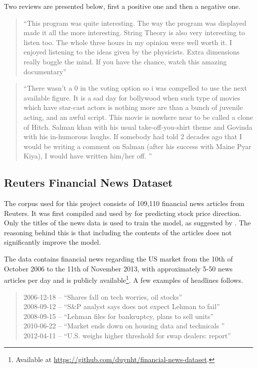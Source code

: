 Two reviews are presented below, first a positive one and then a negative one. 

\begin{quote}
    ``This program was quite interesting. The way the program was displayed made it all the more interesting. String Theory is also very interesting to listen too. The whole three hours in my opinion were well worth it. I enjoyed listening to the ideas given by the physicists. Extra dimensions really boggle the mind. If you have the chance, watch this amazing documentary'' 
\end{quote}
\begin{quote}
    ``There wasn't a 0 in the voting option so i was compelled to use the next available figure. It is a sad day for bollywood when such type of movies which have star-cast actors is nothing more are than a bunch of juvenile acting, and an awful script. This movie is nowhere near to be called a clone of Hitch. Salman khan with his usual take-off-you-shirt theme and Govinda with his in-humorous laughs. If somebody had told 2 decades ago that I would be writing a comment on Salman (after his success with Maine Pyar Kiya), I would have written him/her off. ''
\end{quote}

\subsection{Reuters Financial News Dataset}

The corpus used for this project consists of 109,110 financial news articles from Reuters. It was first compiled and used by \citet{ding2014using} for predicting stock price direction. Only the titles of the news data is used to train the model, as suggested by \citet{ding2014using}. The reasoning behind this is that including the contents of the articles does not significantly improve the model. 

The data contains financial news regarding the US market from the 10th of October 2006 to the 11th of November 2013, with approximately 5-50 news articles per day and is publicly available\footnote{Available at \url{https://github.com/duynht/financial-news-dataset}.}. A few examples of headlines follows. 

\begin{quote}
    2006-12-18 -- ``Shares fall on tech worries, oil stocks'' \\
    2008-09-12 -- ``S\&P analyst says does not expect Lehman to fail'' \\
    2008-09-15 -- ``Lehman files for bankruptcy, plans to sell units'' \\ 
    2010-06-22 -- ``Market ends down on housing data and technicals '' \\
    2012-04-11 -- ``U.S. weighs higher threshold for swap dealers: report'' \\
\end{quote}


